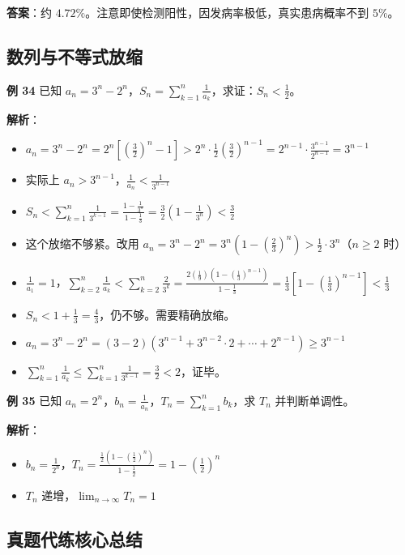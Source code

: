 \textbf{答案}：约 $4.72\%$。注意即使检测阳性，因发病率极低，真实患病概率不到 $5\%$。

\subsection{数列与不等式放缩}

\textbf{例 34} 已知 $a_n=3^n-2^n$，$S_n=\sum_{k=1}^n \frac1{a_k}$，求证：$S_n < \frac12$。

\textbf{解析}：
\begin{itemize}
  \item $a_n=3^n-2^n = 2^n[(\frac32)^n-1] > 2^n\cdot\frac12(\frac32)^{n-1} = 2^{n-1}\cdot\frac{3^{n-1}}{2^{n-1}}=3^{n-1}$
  \item 实际上 $a_n > 3^{n-1}$，$\frac1{a_n} < \frac1{3^{n-1}}$
  \item $S_n < \sum_{k=1}^n \frac1{3^{k-1}} = \frac{1-\frac1{3^n}}{1-\frac13} = \frac32(1-\frac1{3^n}) < \frac32$
  \item 这个放缩不够紧。改用 $a_n = 3^n-2^n = 3^n(1-(\frac23)^n) > \frac12\cdot3^n$（$n\ge2$ 时）
  \item $\frac1{a_1}=1$，$\sum_{k=2}^n\frac1{a_k} < \sum_{k=2}^n \frac2{3^k} = \frac{2(\frac19)(1-(\frac13)^{n-1})}{1-\frac13} = \frac13[1-(\frac13)^{n-1}] < \frac13$
  \item $S_n < 1 + \frac13 = \frac43$，仍不够。需要精确放缩。
  \item $a_n = 3^n-2^n = (3-2)(3^{n-1}+3^{n-2}\cdot2+\cdots+2^{n-1}) \ge 3^{n-1}$
  \item $\sum_{k=1}^n \frac1{a_k} \le \sum_{k=1}^n \frac1{3^{k-1}} = \frac32 < 2$，证毕。
\end{itemize}

\textbf{例 35} 已知 $a_n=2^n$，$b_n=\frac1{a_n}$，$T_n=\sum_{k=1}^n b_k$，求 $T_n$ 并判断单调性。

\textbf{解析}：
\begin{itemize}
  \item $b_n=\frac1{2^n}$，$T_n=\frac{\frac12(1-(\frac12)^n)}{1-\frac12}=1-(\frac12)^n$
  \item $T_n$ 递增，$\lim_{n\to\infty} T_n = 1$
\end{itemize}

\subsection{真题代练核心总结}

